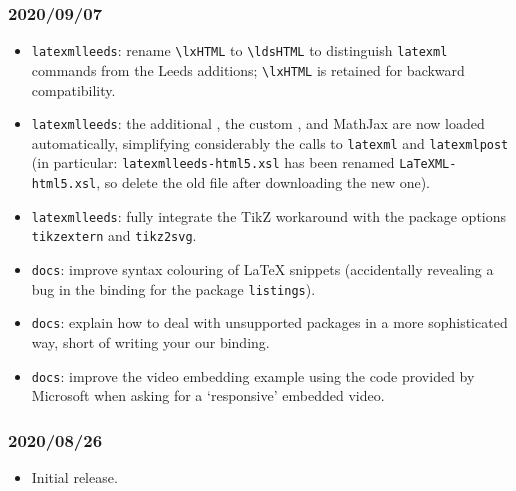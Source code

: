 \documentclass[a4paper]{article}
\def\ltxinline{\lstinline[style=latexml]}
\theoremstyle{definition}
\begin{document}
\subsubsection*{2020/09/07}
\begin{itemize}
  \item \verb|latexmlleeds|: rename \ltxinline|\lxHTML| to \ltxinline|\ldsHTML| to distinguish \verb|latexml| commands from the Leeds additions; \ltxinline|\lxHTML| is retained for backward compatibility.
  \item \verb|latexmlleeds|: the additional \CSS{}, the custom \XSLT{}, and MathJax are now loaded automatically, simplifying considerably the calls to \verb|latexml| and \verb|latexmlpost| (in particular: \verb|latexmlleeds-html5.xsl| has been renamed \verb|LaTeXML-html5.xsl|, so delete the old file after downloading the new one).
  \item \verb|latexmlleeds|: fully integrate the TikZ workaround with the package options \verb|tikzextern| and \verb|tikz2svg|.
  \item \verb|docs|: improve syntax colouring of \LaTeX{} snippets (accidentally revealing a bug in the \LaTeXML{} binding for the package \verb|listings|).
  \item \verb|docs|: explain how to deal with unsupported packages in a more sophisticated way, short of writing your our \LaTeXML{} binding.
  \item \verb|docs|: improve the video embedding example using the code provided by Microsoft when asking for a `responsive' embedded video.
\end{itemize}
\subsubsection*{2020/08/26}
\begin{itemize}
  \item Initial release.
\end{itemize}

\tableofcontents
\end{document}
